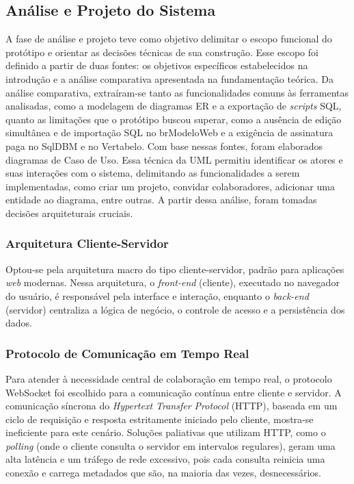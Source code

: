 \subsection[Análise e Projeto do Sistema]{Análise e Projeto do Sistema}
A fase de análise e projeto teve como objetivo delimitar o escopo funcional do protótipo e orientar as decisões técnicas de sua construção. Esse escopo foi definido a partir de duas fontes: os objetivos específicos estabelecidos na introdução e a análise comparativa apresentada na fundamentação teórica. Da análise comparativa, extraíram-se tanto as funcionalidades comuns às ferramentas analisadas, como a modelagem de diagramas ER e a exportação de \textit{scripts} SQL, quanto as limitações que o protótipo buscou superar, como a ausência de edição simultânea e de importação SQL no brModeloWeb e a exigência de assinatura paga no SqlDBM e no Vertabelo. Com base nessas fontes, foram elaborados diagramas de Caso de Uso. Essa técnica da UML permitiu identificar os atores e suas interações com o sistema, delimitando as funcionalidades a serem implementadas, como criar um projeto, convidar colaboradores, adicionar uma entidade ao diagrama, entre outras. A partir dessa análise, foram tomadas decisões arquiteturais cruciais.

\subsubsection[Arquitetura Cliente-Servidor]{Arquitetura Cliente-Servidor}
%
%
Optou-se pela arquitetura macro do tipo cliente-servidor, padrão para aplicações \textit{web} modernas. Nessa arquitetura, o \textit{front-end} (cliente), executado no navegador do usuário, é responsável pela interface e interação, enquanto o \textit{back-end} (servidor) centraliza a lógica de negócio, o controle de acesso e a persistência dos dados.

\subsubsection[Protocolo de Comunicação em Tempo Real]{Protocolo de Comunicação em Tempo Real}

Para atender à necessidade central de colaboração em tempo real, o protocolo WebSocket foi escolhido para a comunicação contínua entre cliente e servidor. A comunicação síncrona do \textit{Hypertext Transfer Protocol} (HTTP), baseada em um ciclo de requisição e resposta estritamente iniciado pelo cliente, mostra-se ineficiente para este cenário. Soluções paliativas que utilizam HTTP, como o \textit{polling} (onde o cliente consulta o servidor em intervalos regulares), geram uma alta latência e um tráfego de rede excessivo, pois cada consulta reinicia uma conexão e carrega metadados que são, na maioria das vezes, desnecessários.

